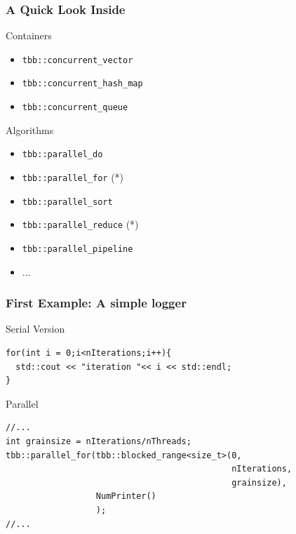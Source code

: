 \documentclass[9pt,pdftex]{beamer}
\begin{document}
\begin{frame}
  \frametitle{A Quick Look Inside}
  \begin{block}{Containers}
    \begin{itemize}
    \item \texttt{tbb::concurrent\_vector}
    \item \texttt{tbb::concurrent\_hash\_map}
    \item \texttt{tbb::concurrent\_queue}
    \end{itemize}
  \end{block}

  \begin{block}{Algorithms}
    \begin{itemize}
    \item \texttt{tbb::parallel\_do}
    \item \texttt{tbb::parallel\_for} (*)
    \item \texttt{tbb::parallel\_sort}
    \item \texttt{tbb::parallel\_reduce} (*)
    \item \texttt{tbb::parallel\_pipeline}
    \item ...
    \end{itemize}
  \end{block}
  
\end{frame}

\begin{frame}[fragile]
  \frametitle{First Example: A simple logger}
  \begin{block}{Serial Version}
    \small
    \begin{lstlisting}[]
for(int i = 0;i<nIterations;i++){ 
  std::cout << "iteration "<< i << std::endl; 
}
    \end{lstlisting}
  \end{block}
   \vfill
   \begin{block}{Parallel}
     \small
     \begin{lstlisting}[]
//...  
int grainsize = nIterations/nThreads;
tbb::parallel_for(tbb::blocked_range<size_t>(0, 
                                             nIterations,
                                             grainsize), 
                  NumPrinter() 
                  ); 
//...
     \end{lstlisting}
   \end{block}

\end{frame}
\end{document}
